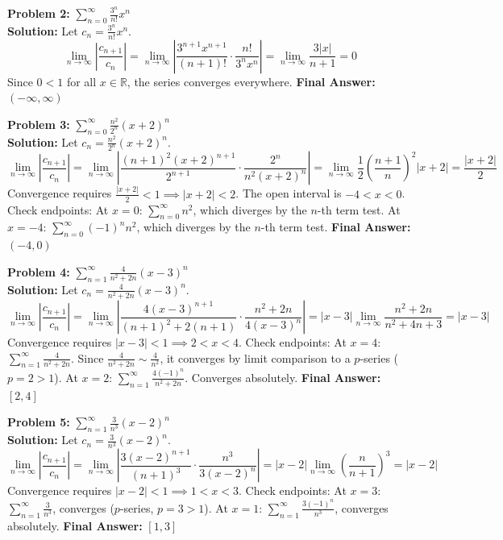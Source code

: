 \documentclass[11pt, letterpaper]{article}
\theoremstyle{definition}
\theoremstyle{remark}
\newcommand{\R}{\mathbb{R}}
\begin{document}
\textbf{Problem 2:} $\displaystyle \sum_{n=0}^{\infty} \frac{3^n}{n!} x^n$
\\[6pt]
\textbf{Solution:} Let $c_n = \frac{3^n}{n!} x^n$.
\[ \lim_{n \to \infty} \left| \frac{c_{n+1}}{c_n} \right| = \lim_{n \to \infty} \left| \frac{3^{n+1} x^{n+1}}{(n+1)!} \cdot \frac{n!}{3^n x^n} \right| = \lim_{n \to \infty} \frac{3 |x|}{n+1} = 0 \]
Since $0 < 1$ for all $x \in \R$, the series converges everywhere.
\textbf{Final Answer:} $(-\infty, \infty)$

\textbf{Problem 3:} $\displaystyle \sum_{n=0}^{\infty} \frac{n^2}{2^n} (x+2)^n$
\\[6pt]
\textbf{Solution:} Let $c_n = \frac{n^2}{2^n} (x+2)^n$.
\[ \lim_{n \to \infty} \left| \frac{c_{n+1}}{c_n} \right| = \lim_{n \to \infty} \left| \frac{(n+1)^2 (x+2)^{n+1}}{2^{n+1}} \cdot \frac{2^n}{n^2 (x+2)^n} \right| = \lim_{n \to \infty} \frac{1}{2} \left(\frac{n+1}{n}\right)^2 |x+2| = \frac{|x+2|}{2} \]
Convergence requires $\frac{|x+2|}{2} < 1 \implies |x+2| < 2$. The open interval is $-4 < x < 0$.
Check endpoints:
At $x = 0$: $\sum_{n=0}^{\infty} n^2$, which diverges by the $n$-th term test.
At $x = -4$: $\sum_{n=0}^{\infty} (-1)^n n^2$, which diverges by the $n$-th term test.
\textbf{Final Answer:} $(-4, 0)$

\textbf{Problem 4:} $\displaystyle \sum_{n=1}^{\infty} \frac{4}{n^2+2n} (x-3)^n$
\\[6pt]
\textbf{Solution:} Let $c_n = \frac{4}{n^2+2n} (x-3)^n$.
\[ \lim_{n \to \infty} \left| \frac{c_{n+1}}{c_n} \right| = \lim_{n \to \infty} \left| \frac{4(x-3)^{n+1}}{(n+1)^2+2(n+1)} \cdot \frac{n^2+2n}{4(x-3)^n} \right| = |x-3| \lim_{n \to \infty} \frac{n^2+2n}{n^2+4n+3} = |x-3| \]
Convergence requires $|x-3| < 1 \implies 2 < x < 4$.
Check endpoints:
At $x = 4$: $\sum_{n=1}^{\infty} \frac{4}{n^2+2n}$. Since $\frac{4}{n^2+2n} \sim \frac{4}{n^2}$, it converges by limit comparison to a $p$-series ($p=2 > 1$).
At $x = 2$: $\sum_{n=1}^{\infty} \frac{4(-1)^n}{n^2+2n}$. Converges absolutely.
\textbf{Final Answer:} $[2, 4]$

\textbf{Problem 5:} $\displaystyle \sum_{n=1}^{\infty} \frac{3}{n^3} (x-2)^n$
\\[6pt]
\textbf{Solution:} Let $c_n = \frac{3}{n^3} (x-2)^n$.
\[ \lim_{n \to \infty} \left| \frac{c_{n+1}}{c_n} \right| = \lim_{n \to \infty} \left| \frac{3(x-2)^{n+1}}{(n+1)^3} \cdot \frac{n^3}{3(x-2)^n} \right| = |x-2| \lim_{n \to \infty} \left(\frac{n}{n+1}\right)^3 = |x-2| \]
Convergence requires $|x-2| < 1 \implies 1 < x < 3$.
Check endpoints:
At $x = 3$: $\sum_{n=1}^{\infty} \frac{3}{n^3}$, converges ($p$-series, $p=3 > 1$).
At $x = 1$: $\sum_{n=1}^{\infty} \frac{3(-1)^n}{n^3}$, converges absolutely.
\textbf{Final Answer:} $[1, 3]$
\end{document}
